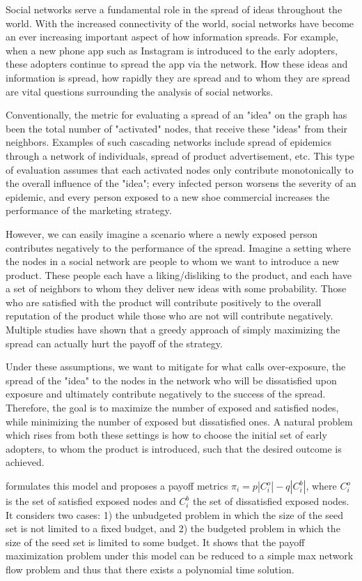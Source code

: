 Social networks serve a fundamental role in the spread of ideas throughout the world. With the increased connectivity of the world, social networks have become an ever increasing important aspect of how information spreads. For example, when a new phone app such as Instagram is introduced to the early adopters, these adopters continue to spread the app via the network. How these ideas and information is spread, how rapidly they are spread and to whom they are spread are vital questions surrounding the analysis of social networks. 

Conventionally, the metric for evaluating a spread of an "idea" on the graph has been the total number of "activated" nodes, that receive these "ideas" from their neighbors. Examples of such cascading networks include spread of epidemics through a network of individuals, spread of product advertisement, etc. This type of evaluation assumes that each activated nodes only contribute monotonically to the overall influence of the "idea"; every infected person worsens the severity of an epidemic, and every person exposed to a new shoe commercial increases the performance of the marketing strategy.

However, we can easily imagine a scenario where a newly exposed person contributes negatively to the performance of the spread. Imagine a setting where the nodes in a social network are people to whom we want to introduce a new product. These people each have a liking/disliking to the product, and each have a set of neighbors to whom they deliver new ideas with some probability. Those who are satisfied with the product will contribute positively to the overall reputation of the product while those who are not will contribute negatively. Multiple studies have shown that a greedy approach of simply maximizing the spread can actually hurt the payoff of the strategy.

Under these assumptions, we want to mitigate for what \cite{Abebe} calls over-exposure, the spread of the "idea" to the nodes in the network who will be dissatisfied upon exposure and ultimately contribute negatively to the success of the spread. Therefore, the goal is to maximize the number of exposed and satisfied nodes, while minimizing the number of exposed but dissatisfied ones. A natural problem which rises from both these settings is how to choose the initial set of early adopters, to whom the product is introduced, such that the desired outcome is achieved.

\cite{Abebe} formulates this model and proposes a payoff metrics $\pi_i = p|C_i^o| - q|C_i^b|$, where $C_i^o$ is the set of satisfied exposed nodes and $C_i^b$ the set of dissatisfied exposed nodes. It considers two cases: 1) the unbudgeted problem in which the size of the seed set is not limited to a fixed budget, and 2) the budgeted problem in which the size of the seed set is limited to some budget. It shows that the payoff maximization problem under this model can be reduced to a simple max network flow problem and thus that there exists a polynomial time solution.

